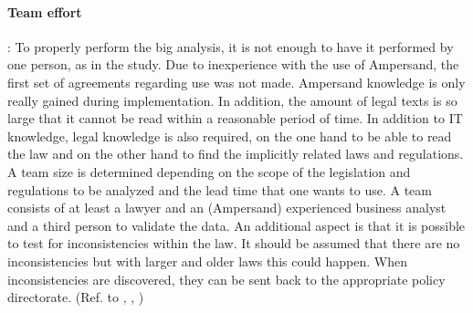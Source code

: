 \paragraph{\textbf{Team effort}}\label{swot:s_team_effort}:
To properly perform the \acrshort{big} analysis, it is not enough to have it performed by one person, as in the study.
Due to inexperience with the use of Ampersand, the first set of agreements regarding use was not made.
Ampersand knowledge is only really gained during implementation.
In addition, the amount of legal texts is so large that it cannot be read within a reasonable period of time.
In addition to IT knowledge, legal knowledge is also required, on the one hand to be able to read the law and on the other hand to find the implicitly related laws and regulations.
A team size is determined depending on the scope of the legislation and regulations to be analyzed and the lead time that one wants to use.
A team consists of at least a lawyer and an (Ampersand) experienced business analyst and a third person to validate the data.
An additional aspect is that it is possible to test for inconsistencies within the law.
It should be assumed that there are no inconsistencies but with larger and older laws this could happen.
When inconsistencies are discovered, they can be sent back to the appropriate policy directorate.
(Ref. to , , )